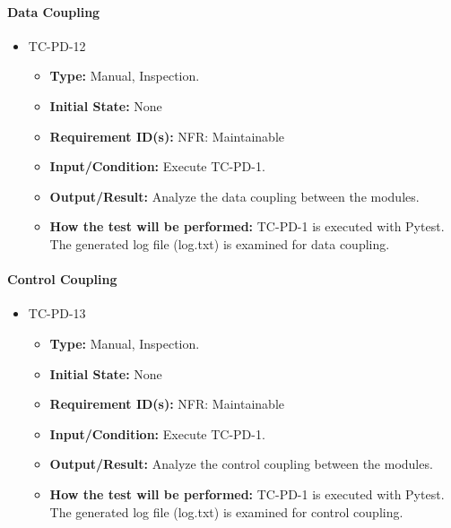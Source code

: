 \documentclass[12pt, titlepage]{article}
\begin{document}
\paragraph{Data Coupling}
\begin{itemize}
\item{TC-PD-12\\}
\begin{itemize}
\item{\textbf{Type:}} Manual, Inspection.
					
\item{\textbf{Initial State:}} None

\item{\textbf{Requirement ID(s):}}  NFR: Maintainable
					
\item{\textbf{Input/Condition:}}  Execute TC-PD-1. 
					
\item{\textbf{Output/Result:}} Analyze the data coupling between the modules.

\item{\textbf{How the test will be performed:}}  TC-PD-1 is executed with Pytest. The generated log file (log.txt)
is examined for data coupling.
\end{itemize}
\end{itemize}

\paragraph{Control Coupling}
\begin{itemize}
\item{TC-PD-13\\}
\begin{itemize}
\item{\textbf{Type:}} Manual, Inspection.
					
\item{\textbf{Initial State:}} None

\item{\textbf{Requirement ID(s):}} NFR: Maintainable
					
\item{\textbf{Input/Condition:}}  Execute TC-PD-1. 
					
\item{\textbf{Output/Result:}} Analyze the control coupling between the modules.

\item{\textbf{How the test will be performed:}}  TC-PD-1 is executed with Pytest. The generated log file (log.txt)
is examined for control coupling.
\end{itemize}
\end{itemize}
\end{document}
